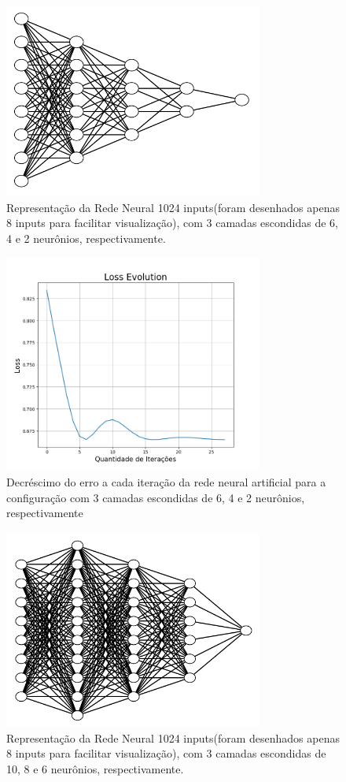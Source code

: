 \documentclass{article}
\begin{document}
\begin{figure}[ht]
\centering
\includegraphics[width=8.5cm]{rna_6_4_2}
\caption{Representação da Rede Neural 1024 inputs(foram desenhados apenas 8 inputs para facilitar visualização), com 3 camadas escondidas de 6, 4 e 2 neurônios, respectivamente.}
\label{rna_6_4_2}
\end{figure}

\begin{figure}[ht]
\centering
\includegraphics[width=8.5cm]{rna_6_4_2_loss}
\caption{Decréscimo do erro a cada iteração da rede neural artificial para a configuração com 3 camadas escondidas de 6, 4 e 2 neurônios, respectivamente}
\label{rna_6_4_2_loss}
\end{figure}

\begin{figure}[ht]
\centering
\includegraphics[width=8.5cm]{rna_10_8_6}
\caption{Representação da Rede Neural 1024 inputs(foram desenhados apenas 8 inputs para facilitar visualização), com 3 camadas escondidas de 10, 8 e 6 neurônios, respectivamente.}
\label{rna_10_8_6}
\end{figure}
\end{document}
